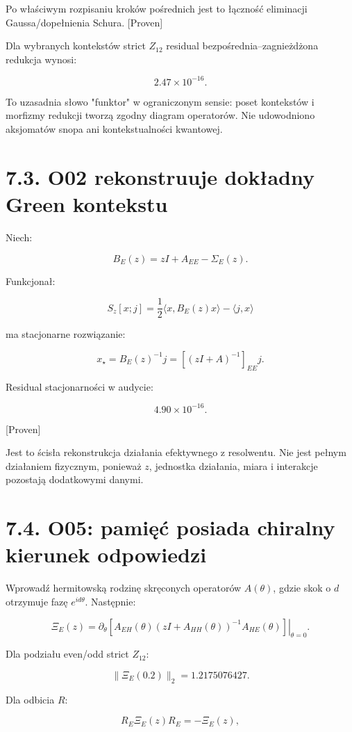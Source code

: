 \documentclass[11pt,a4paper,openany]{report}
\newcommand{\statusProven}{\textcolor{fingreen}{[Proven]}}
\begin{document}
Po właściwym rozpisaniu kroków pośrednich jest to łączność eliminacji Gaussa/\allowbreak{}dopełnienia Schura. \statusProven{}

Dla wybranych kontekstów strict \(Z_{12}\) residual bezpośrednia--zagnie\.zd\.zona redukcja wynosi:

\[
2.47\times10^{-16}.
\]

To uzasadnia słowo "funktor" w ograniczonym sensie: poset kontekstów i morfizmy redukcji tworzą zgodny diagram operatorów. Nie udowodniono aksjomatów snopa ani kontekstualności kwantowej.

\section{7.3. O02 rekonstruuje dokładny Green kontekstu}

Niech:

\[
B_E(z)=zI+A_{EE}-\Sigma_E(z).
\]

Funkcjonał:

\[
S_z[x;j]
=\frac12\langle x,B_E(z)x\rangle-\langle j,x\rangle
\]

ma stacjonarne rozwiązanie:

\[
x_\star=B_E(z)^{-1}j
=
\left[(zI+A)^{-1}\right]_{EE}j.
\]

Residual stacjonarności w audycie:

\[
4.90\times10^{-16}.
\]

\statusProven{}

Jest to ścisła rekonstrukcja działania efektywnego z resolwentu. Nie jest pełnym działaniem fizycznym, poniewa\.z \(z\), jednostka działania, miara i interakcje pozostają dodatkowymi danymi.

\section{7.4. O05: pamięć posiada chiralny kierunek odpowiedzi}

Wprowadź hermitowską rodzinę skręconych operatorów \(A(\theta)\), gdzie skok o \(d\) otrzymuje fazę \(e^{id\theta}\). Następnie:

\[
\Xi_E(z)
=
\left.\partial_\theta
\left[
A_{EH}(\theta)
(zI+A_{HH}(\theta))^{-1}
A_{HE}(\theta)
\right]\right|_{\theta=0}.
\]

Dla podziału even/\allowbreak{}odd strict \(Z_{12}\):

\[
\|\Xi_E(0.2)\|_2=1.2175076427.
\]

Dla odbicia \(R\):

\[
R_E\Xi_E(z)R_E=-\Xi_E(z),
\]
\end{document}
